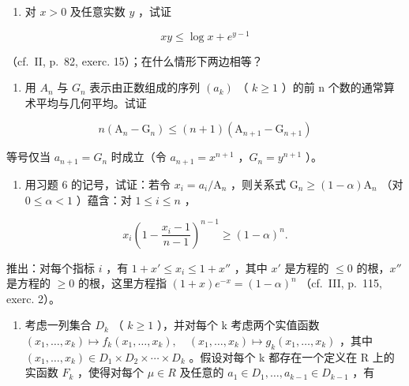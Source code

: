 \begin{enumerate}
\def\labelenumi{\arabic{enumi})}
\setcounter{enumi}{4}
\tightlist
\item
  对 \(x > 0\) 及任意实数 \(y\) ，试证
\end{enumerate}

\[
x y \leqslant \log x + e ^ {y - 1}
\]

（cf.~II, p.~82, exerc. 15）；在什么情形下两边相等？

\begin{enumerate}
\def\labelenumi{\arabic{enumi})}
\setcounter{enumi}{5}
\tightlist
\item
  用 \(A_{n}\) 与 \(G_{n}\) 表示由正数组成的序列 \((a_{k})\) （ \(k \geqslant 1\) ）的前 n 个数的通常算术平均与几何平均。试证
\end{enumerate}

\[
n \left(\mathrm{A} _ {n} - \mathrm{G} _ {n}\right) \leqslant (n + 1) \left(\mathrm{A} _ {n + 1} - \mathrm{G} _ {n + 1}\right)
\]

等号仅当 \(a_{n+1} = G_{n}\) 时成立（令 \(a_{n+1} = x^{n+1}\) ，\(G_{n} = y^{n+1}\) ）。

\begin{enumerate}
\def\labelenumi{\arabic{enumi})}
\setcounter{enumi}{6}
\tightlist
\item
  用习题 6 的记号，试证：若令 \(x_{i} = a_{i} / \mathrm{A}_{n}\) ，则关系式 \(\mathrm{G}_n \geqslant (1 - \alpha)\mathrm{A}_n\) （对 \(0 \leqslant \alpha < 1\) ）蕴含：对 \(1 \leqslant i \leqslant n\) ，
\end{enumerate}

\[
x _ {i} \left(1 - \frac {x _ {i} - 1}{n - 1}\right) ^ {n - 1} \geqslant (1 - \alpha) ^ {n}.
\]

推出：对每个指标 \(i\) ，有 \(1 + x' \leqslant x_i \leqslant 1 + x''\) ，其中 \(x'\) 是方程的 \(\leqslant 0\) 的根，\(x''\) 是方程的 \(\geqslant 0\) 的根，这里方程指 \((1 + x)e^{-x} = (1 - \alpha)^n\) （cf.~III, p.~115, exerc. 2）。

\begin{enumerate}
\def\labelenumi{\arabic{enumi})}
\setcounter{enumi}{7}
\tightlist
\item
  考虑一列集合 \(D_{k}\) （ \(k \geqslant 1\) ），并对每个 k 考虑两个实值函数 \((x_{1}, \ldots, x_{k}) \mapsto f_{k}(x_{1}, \ldots, x_{k}), \quad (x_{1}, \ldots, x_{k}) \mapsto g_{k}(x_{1}, \ldots, x_{k})\) ，其中 \((x_{1}, \ldots, x_{k}) \in D_{1} \times D_{2} \times \cdots \times D_{k}\) 。假设对每个 k 都存在一个定义在 R 上的实函数 \(F_{k}\) ，使得对每个 \(\mu \in R\) 及任意的 \(a_{1} \in D_{1}, \ldots, a_{k-1} \in D_{k-1}\) ，有
\end{enumerate}

